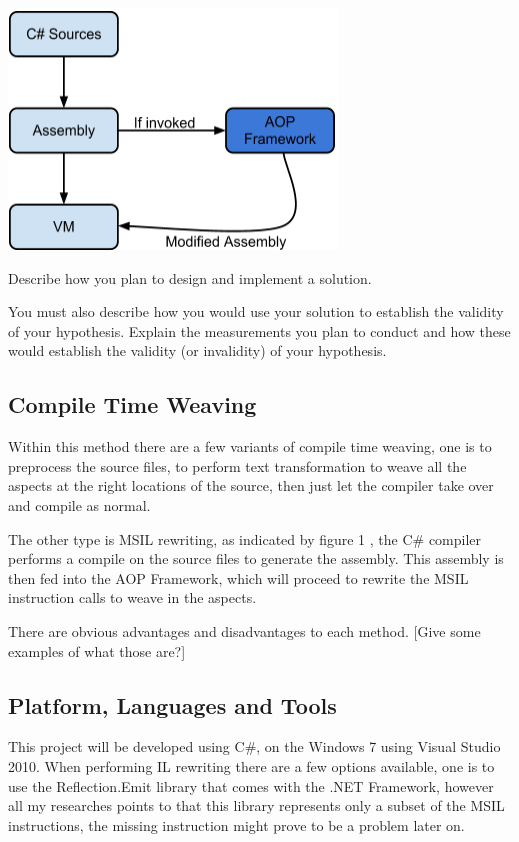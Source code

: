 \includegraphics[width=331px,keepaspectratio=true]{model_overview.png}

Describe how you plan to design and implement a solution. 

You must also describe how you would use your solution to establish the validity of your hypothesis. Explain the measurements you plan to conduct and how these would establish the validity (or invalidity) of your hypothesis.

\subsection{Compile Time Weaving}
Within this method there are a few variants of compile time weaving, one is to preprocess the source files, to perform text transformation to weave all the aspects at the right locations of the source, then just let the compiler take over and compile as normal.

The other type is MSIL rewriting, as indicated by figure 1 , the C\# compiler performs a compile on the source files to generate the assembly. This assembly is then fed into the AOP Framework, which will proceed to rewrite the MSIL instruction calls to weave in the aspects.

There are obvious advantages and disadvantages to each method. [Give some examples of what those are?]

\subsection{Platform, Languages and Tools}
This project will be developed using C\#, on the Windows 7 using Visual Studio 2010. When performing IL rewriting there are a few options available, one is to use the Reflection.Emit library that comes with the .NET Framework, however all my researches points to that this library represents only a subset of the MSIL instructions, the missing instruction might prove to be a problem later on.


